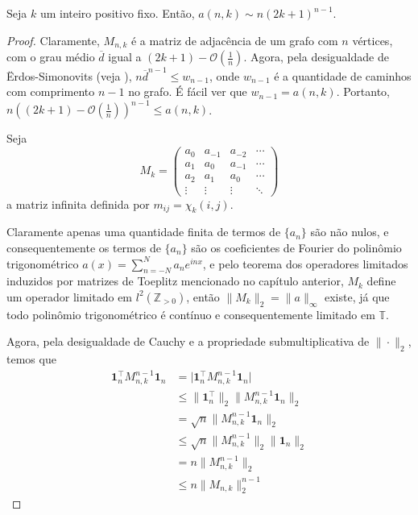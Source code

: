 \begin{theorem} \label{th:asymptotic}
  Seja $k$ um inteiro positivo fixo. Então, $a(n, k) \sim n(2k+1)^{n-1}$.
\end{theorem}
\begin{proof}
  Claramente, $M_{n,k}$ é a matriz de adjacência de um grafo com $n$ vértices, com o grau médio $\overline{d}$ igual a $(2k + 1) - \mathcal{O}(\frac{1}{n})$. Agora, pela desigualdade de Ërdos-Simonovits (veja \cite{erdossimonovits}), $n \overline{d}^{n-1} \le w_{n-1}$, onde $w_{n-1}$ é a quantidade de caminhos com comprimento $n-1$ no grafo. É fácil ver que $w_{n-1} = a(n, k)$. Portanto, $n ((2k + 1) - \mathcal{O}(\frac{1}{n}))^{n-1} \le a(n, k)$.

  Seja \[M_k = \begin{pmatrix} a_{0} & a_{-1} & a_{-2} & \cdots \\ a_{1} & a_{0} & a_{-1} & \cdots \\ a_2 & a_{1} & a_{0} & \cdots \\ \vdots & \vdots & \vdots & \ddots \end{pmatrix}\] a matriz infinita definida por $m_{ij} = \chi_k(i, j)$.

  Claramente apenas uma quantidade finita de termos de $\{a_n\}$ são não nulos, e consequentemente os termos de $\{ a_n \}$ são os coeficientes de Fourier do polinômio trigonométrico $a(x) = \sum_{n = -N}^N a_n e^{i n x}$, e pelo teorema dos operadores limitados induzidos por matrizes de Toeplitz mencionado no capítulo anterior, $M_k$ define um operador limitado em $l^2(\mathbb{Z}_{> 0})$, então $\|M_k\|_2 = \| a \|_{\infty}$ existe, já que todo polinômio trigonométrico é contínuo e consequentemente limitado em $\mathbb{T}$.

  Agora, pela desigualdade de Cauchy e a propriedade submultiplicativa de $\| \cdot \|_2$, temos que
  \begin{align*}
    \mathbf{1}_n^\intercal M_{n,k}^{n-1} \mathbf{1}_n & = \lvert \mathbf{1}_n^\intercal M_{n,k}^{n-1} \mathbf{1}_n\rvert      \\
                                                      & \le \| \mathbf{1}_n^\intercal \|_2 \| M_{n,k}^{n-1} \mathbf{1}_n \|_2 \\
                                                      & = \sqrt{n} \| M_{n,k}^{n-1} \mathbf{1}_n \|_2                         \\
                                                      & \le \sqrt{n} \| M_{n,k}^{n-1} \|_2 \| \mathbf{1}_n \|_2               \\
                                                      & = n \| M_{n,k}^{n-1} \|_2                                             \\
                                                      & \le n \| M_{n,k} \|_2^{n-1}
  \end{align*}


\end{proof}
